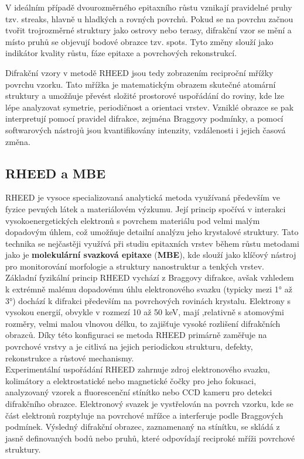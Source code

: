 \documentclass[a4paper,11pt]{article}
\begin{document}
V ideálním případě dvourozměrného epitaxního růstu vznikají pravidelné pruhy tzv. streaks, hlavně u hladkých a rovných povrchů. Pokud se na povrchu začnou tvořit trojrozměrné struktury jako ostrovy nebo terasy, difrakční vzor se mění a místo pruhů se objevují bodové obrazce tzv. spots. Tyto změny slouží jako indikátor kvality růstu, fáze epitaxe a povrchových rekonstrukcí.

Difrakční vzory v metodě RHEED jsou tedy zobrazením reciproční mřížky povrchu vzorku. Tato mřížka je matematickým obrazem skutečné atomární struktury a umožňuje převést složité prostorové uspořádání do roviny, kde lze lépe analyzovat symetrie, periodičnost a orientaci vrstev. Vzniklé obrazce se pak interpretují pomocí pravidel difrakce, zejména Braggovy podmínky, a pomocí softwarových nástrojů jsou kvantifikovány intenzity, vzdálenosti i jejich časová změna.\cite{Vzory}
\newpage

\subsection{RHEED a MBE}
RHEED je vysoce specializovaná analytická metoda využívaná především ve fyzice pevných látek a materiálovém výzkumu. Její princip spočívá v interakci vysokoenergetických elektronů s povrchem materiálu pod velmi malým dopadovým úhlem, což umožňuje detailní analýzu jeho krystalové struktury. Tato technika se nejčastěji využívá při studiu epitaxních vrstev během růstu metodami jako je \textbf{molekulární svazková epitaxe} (\textbf{MBE}), kde slouží jako klíčový nástroj pro monitorování morfologie a struktury nanostruktur a tenkých vrstev.\\

Základní fyzikální princip RHEED vychází z Braggovy difrakce, avšak vzhledem k extrémně malému dopadovému úhlu elektronového svazku (typicky mezi 1° až 3°) dochází k difrakci především na povrchových rovinách krystalu. Elektrony s vysokou energií, obvykle v rozmezí 10 až 50 keV, mají ,relativně s atomovými rozměry, velmi malou vlnovou délku, to zajišťuje vysoké rozlišení difrakčních obrazců. Díky této konfiguraci se metoda RHEED primárně zaměřuje na povrchové vrstvy a je citlivá na jejich periodickou strukturu, defekty, rekonstrukce a růstové mechanismy.\\

Experimentální uspořádání RHEED zahrnuje zdroj elektronového svazku, kolimátory a elektrostatické nebo magnetické čočky pro jeho fokusaci, analyzovaný vzorek a fluorescenční stínítko nebo CCD kameru pro detekci difrakčního obrazce. Elektronový svazek je vystřelován na povrch vzorku, kde se část elektronů rozptyluje na povrchové mřížce a interferuje podle Braggových podmínek. Výsledný difrakční obrazec, zaznamenaný na stínítku, se skládá z jasně definovaných bodů nebo pruhů, které odpovídají reciproké mříži povrchové struktury.\\
\end{document}
